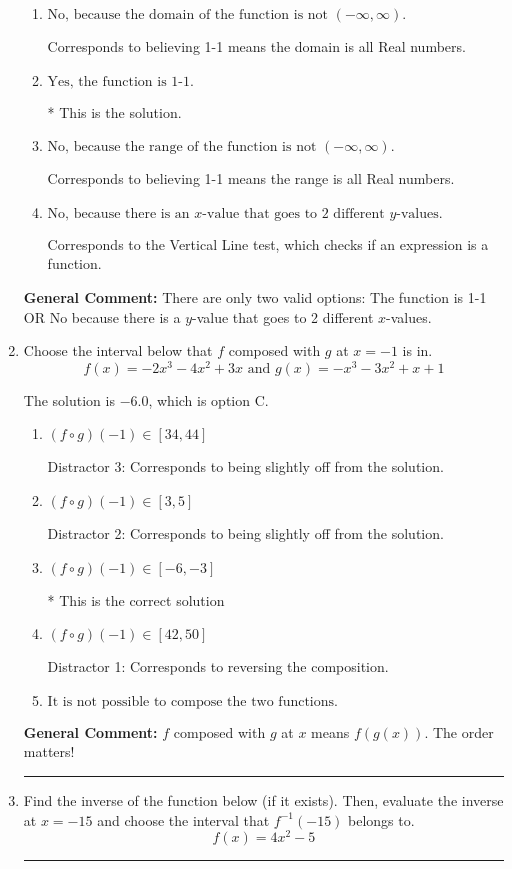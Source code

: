 \documentclass{extbook}[14pt]
\newcommand{\litem}[1]{\item #1

\rule{\textwidth}{0.4pt}}
\begin{document}
\begin{enumerate}
{\begin{enumerate}[label=\Alph*.]
Corresponds to the Horizontal Line test, which this function passes.
\item \( \text{No, because the domain of the function is not $(-\infty, \infty)$.} \)

Corresponds to believing 1-1 means the domain is all Real numbers.
\item \( \text{Yes, the function is 1-1.} \)

* This is the solution.
\item \( \text{No, because the range of the function is not $(-\infty, \infty)$.} \)

Corresponds to believing 1-1 means the range is all Real numbers.
\item \( \text{No, because there is an $x$-value that goes to 2 different $y$-values.} \)

Corresponds to the Vertical Line test, which checks if an expression is a function.
\end{enumerate}

\textbf{General Comment:} There are only two valid options: The function is 1-1 OR No because there is a $y$-value that goes to 2 different $x$-values.
}
\litem{
Choose the interval below that $f$ composed with $g$ at $x=-1$ is in.
\[ f(x) = -2x^{3} -4 x^{2} +3 x \text{ and } g(x) = -x^{3} -3 x^{2} +x + 1 \]

The solution is \( -6.0 \), which is option C.\begin{enumerate}[label=\Alph*.]
\item \( (f \circ g)(-1) \in [34, 44] \)

 Distractor 3: Corresponds to being slightly off from the solution.
\item \( (f \circ g)(-1) \in [3, 5] \)

 Distractor 2: Corresponds to being slightly off from the solution.
\item \( (f \circ g)(-1) \in [-6, -3] \)

* This is the correct solution
\item \( (f \circ g)(-1) \in [42, 50] \)

 Distractor 1: Corresponds to reversing the composition.
\item \( \text{It is not possible to compose the two functions.} \)


\end{enumerate}

\textbf{General Comment:} $f$ composed with $g$ at $x$ means $f(g(x))$. The order matters!
}
\litem{
Find the inverse of the function below (if it exists). Then, evaluate the inverse at $x = -15$ and choose the interval that $f^{-1}(-15)$ belongs to.
\[ f(x) = 4 x^2 - 5 \]

}
\end{enumerate}
\end{document}
